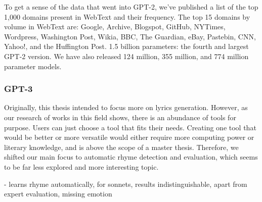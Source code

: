 To get a sense of the data that went into GPT-2, we’ve published a list of the top 1,000 domains present in WebText and their frequency. The top 15 domains by volume in WebText are: Google, Archive, Blogspot, GitHub, NYTimes, Wordpress, Washington Post, Wikia, BBC, The Guardian, eBay, Pastebin, CNN, Yahoo!, and the Huffington Post.
1.5 billion parameters: the fourth and largest GPT-2 version. We have also released 124 million, 355 million, and 774 million parameter models.
\cite{radford2019gpt2}
\subsubsection*{GPT-3}


Originally, this thesis intended to focus more on lyrics generation. However, as our research of works in this field shows, there is an abundance of tools for purpose. Users can just choose a tool that fits their needs. Creating one tool that would be better or more versatile would either require more computing power or literary knowledge, and is above the scope of a master thesis. Therefore, we shifted our main focus to automatic rhyme detection and evaluation, which seems to be far less explored and more interesting topic.



\cite{lau2018deep} - learns rhyme automatically, for sonnets, results indistinguishable, apart from expert evaluation, missing emotion
